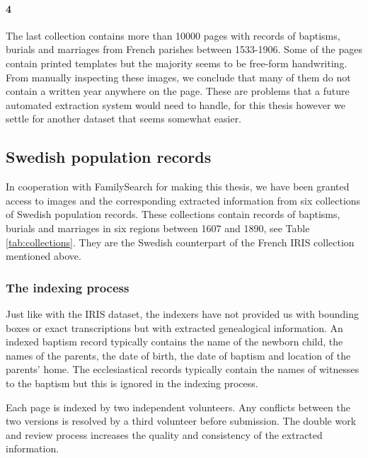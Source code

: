 \paragraph{4}
The last collection contains more than 10000 pages with records of baptisms, burials and marriages from French parishes between 1533-1906. Some of the pages contain printed templates but the majority seems to be free-form handwriting.
From manually inspecting these images, we conclude that many of them do not contain a written year anywhere on the page. These are problems that a future automated extraction system would need to handle, for this thesis however we settle for another dataset that seems somewhat easier.


\subsection{Swedish population records}



In cooperation with FamilySearch for making this thesis, we have been granted access to images and the corresponding extracted information from six collections of Swedish population records.
These collections contain records of baptisms, burials and marriages in six regions between 1607 and 1890, see Table \ref{tab:collections}. They are the Swedish counterpart of the French IRIS collection mentioned above.



\subsubsection{The indexing process}

Just like with the IRIS dataset, the indexers have not provided us with bounding boxes or exact transcriptions but with extracted genealogical information. An indexed baptism record typically contains the name of the newborn child, the names of the parents, the date of birth, the date of baptism and location of the parents' home. The ecclesiastical records typically contain the names of witnesses to the baptism but this is ignored in the indexing process.

Each page is indexed by two independent volunteers. Any conflicts between the two versions is resolved by a third volunteer before submission.
The double work and review process increases the quality and consistency of the extracted information.

